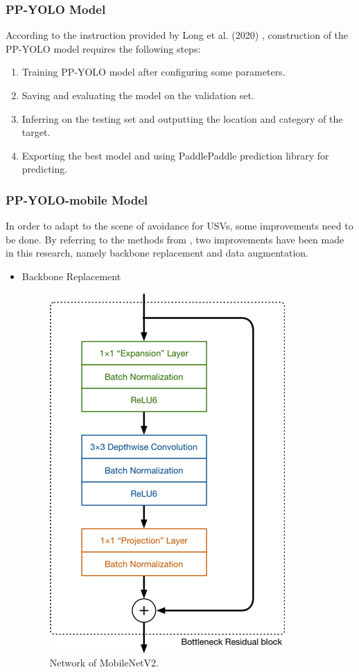\documentclass[sensors,article,submit,moreauthors,pdftex]{Definitions/mdpi}
\begin{document}
\begin{paracol}{2}
\subsubsection{PP-YOLO Model}

According to the instruction provided by Long et al. (2020) \cite{long2020pp}, construction of the PP-YOLO model requires the following steps:

\begin{enumerate}
\item Training PP-YOLO model after configuring some parameters.
\item Saving and evaluating the model on the validation set.
\item Inferring on the testing set and outputting the location and category of the target.
\item Exporting the best model and using PaddlePaddle prediction library for predicting.
\end{enumerate}

\subsubsection{PP-YOLO-mobile Model}

In order to adapt to the scene of avoidance for USVs, 
some improvements need to be done. By referring to the methods from \cite{zoph2019learning, mahto2020refining, mandal2020object}, two improvements have been made in this research, namely backbone replacement and data augmentation.

\begin{itemize}
\item{Backbone Replacement}

\begin{figure}[htbp]
\centering
\includegraphics[width=0.45\columnwidth]{images/MobileNetV2-structure.png}
\caption{Network of MobileNetV2.}
\label{fig:Microstructure}
\end{figure}


\end{itemize}
\end{paracol}
\end{document}
